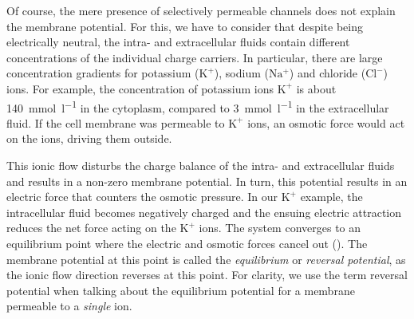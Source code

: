 Of course, the mere presence of selectively permeable channels does not explain the membrane potential.
For this, we have to consider that despite being electrically neutral, the intra- and extracellular fluids contain different concentrations of the individual charge carriers.
In particular, there are large concentration gradients for potassium ($\mathrm{K^+}$), sodium ($\mathrm{Na^+}$) and chloride ($\mathrm{Cl^-}$) ions.
For example, the concentration of potassium ions $\mathrm{K^+}$ is about \SI{140}{\milli\mol\per\litre} in the cytoplasm, compared to \SI{3}{\milli\mol\per\litre} in the extracellular fluid.
If the cell membrane was permeable to $\mathrm{K}^+$ ions, an osmotic force would act on the ions, driving them outside.

This ionic flow disturbs the charge balance of the intra- and extracellular fluids and results in a non-zero membrane potential.
In turn, this potential results in an electric force that counters the osmotic pressure.
In our $\mathrm{K}^+$ example, the intracellular fluid becomes negatively charged and the ensuing electric attraction reduces the net force acting on the $\mathrm{K}^+$ ions.
The system converges to an equilibrium point where the electric and osmotic forces cancel out ().
The membrane potential at this point is called the \emph{equilibrium} or \emph{reversal potential}, as the ionic flow direction reverses at this point.
For clarity, we use the term reversal potential when talking about the equilibrium potential for a membrane permeable to a \emph{single} ion.


